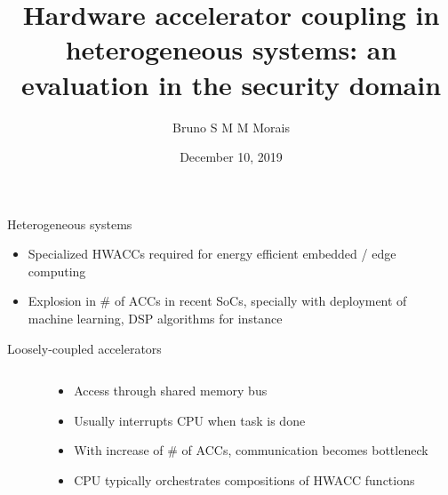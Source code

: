 \documentclass[dvipsnames]{beamer}
\title{Hardware accelerator coupling in heterogeneous systems: an evaluation in the
  security domain}
\author{Bruno S M M Morais}
\date{December 10, 2019}
\begin{document}
\maketitle

\begin{frame}{Heterogeneous systems}
  \begin{itemize}
  \item Specialized HWACCs required for energy efficient embedded / edge computing
  \item Explosion in \# of ACCs in recent SoCs, specially with deployment of
    machine learning, DSP algorithms for instance
  \end{itemize}
\end{frame}

\begin{frame}{Loosely-coupled accelerators}
  \begin{columns}[T]
    \begin{column}{0.35\textwidth}
    \end{column}
    \hfill
    \begin{column}{0.65\textwidth}
      \centering
      \begin{itemize}
      \item Access through shared memory bus
      \item Usually interrupts CPU when task is done
      \item With increase of \# of ACCs, communication becomes bottleneck
      \item CPU typically orchestrates compositions of HWACC functions
      \end{itemize}
    \end{column}
  \end{columns}
\end{frame}
\end{document}
